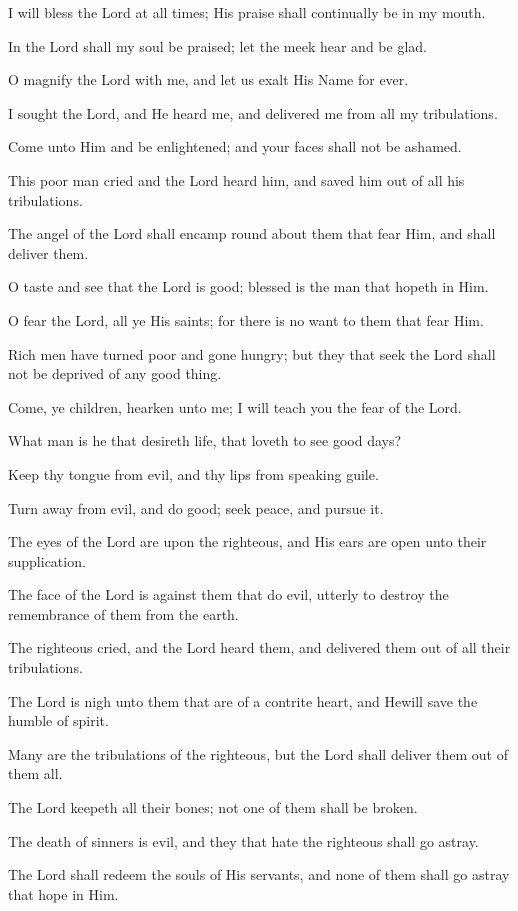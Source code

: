 I will bless the Lord at all times; His praise shall continually be in my mouth.

In the Lord shall my soul be praised; let the meek hear and be glad.

O magnify the Lord with me, and let us exalt His Name for ever.

I sought the Lord, and He heard me, and delivered me from all my tribulations.

Come unto Him and be enlightened; and your faces shall not be ashamed.

This poor man cried and the Lord heard him, and saved him out of all his tribulations.

The angel of the Lord shall encamp round about them that fear Him, and shall deliver them.

O taste and see that the Lord is good; blessed is the man that hopeth in Him.

O fear the Lord, all ye His saints; for there is no want to them that fear Him.

Rich men have turned poor and gone hungry; but they that seek the Lord shall not be deprived of any good thing.

Come, ye children, hearken unto me; I will teach you the fear of the Lord.

What man is he that desireth life, that loveth to see good days?

Keep thy tongue from evil, and thy lips from speaking guile.

Turn away from evil, and do good; seek peace, and pursue it.

The eyes of the Lord are upon the righteous, and His ears are open unto their supplication.

The face of the Lord is against them that do evil, utterly to destroy the remembrance of them from the earth.

The righteous cried, and the Lord heard them, and delivered them out of all their tribulations.

The Lord is nigh unto them that are of a contrite heart, and Hewill save the humble of spirit.

Many are the tribulations of the righteous, but the Lord shall deliver them out of them all.

The Lord keepeth all their bones; not one of them shall be broken.

The death of sinners is evil, and they that hate the righteous shall go astray.

The Lord shall redeem the souls of His servants, and none of them shall go astray that hope in Him.
